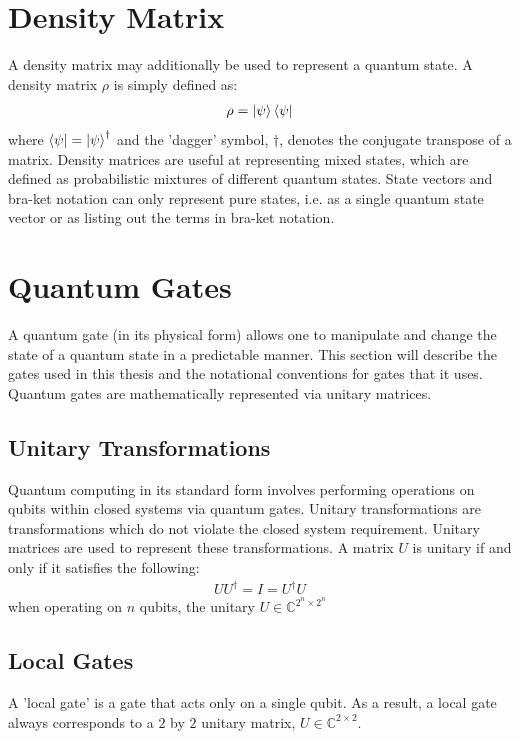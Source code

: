 \section{Density Matrix}
A density matrix may additionally be used to represent a quantum state. A density matrix $\rho$ is simply defined as:
\begin{align}
\rho = \ket{\psi} \bra{\psi}
\end{align}
where $\bra{\psi} = \ket{\psi}^{\dagger}$ and the 'dagger' symbol, $\dagger$, denotes the conjugate transpose of a matrix. Density matrices are useful at representing mixed states, which are defined as probabilistic mixtures of different quantum states. State vectors and bra-ket notation can only represent pure states, i.e. as a single quantum state vector or as listing out the terms in bra-ket notation.

\section{Quantum Gates}
A quantum gate (in its physical form) allows one to manipulate and change the state of a quantum state in a predictable manner. This section will describe the gates used in this thesis and the notational conventions for gates that it uses. Quantum gates are mathematically represented via unitary matrices.
\subsection{Unitary Transformations}
Quantum computing in its standard form involves performing operations on qubits within closed systems via quantum gates. Unitary transformations are transformations which do not violate the closed system requirement. Unitary matrices are used to represent these transformations. A matrix $U$ is unitary if and only if it satisfies the following:
\begin{align}
UU^{\dagger} = I = U^{\dagger}U
\end{align}
when operating on $n$ qubits, the unitary $U \in \mathbb{C}^{2^n \times 2^n}$
\subsection{Local Gates}
\label{sec:localGate}
A 'local gate' is a gate that acts only on a single qubit. As a result, a local gate always corresponds to a $2$ by $2$ unitary matrix, $U \in \mathbb{C}^{2 \times 2}$.

